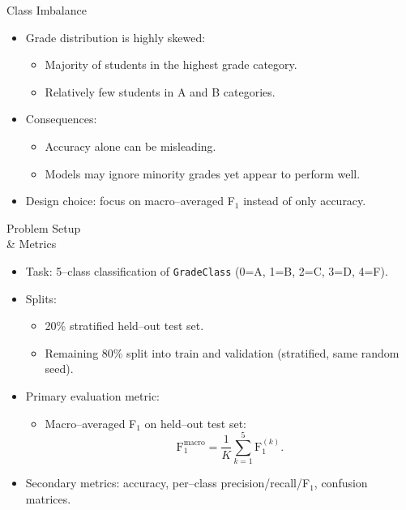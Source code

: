 \documentclass[aspectratio=169]{beamer}
\begin{document}
\begin{frame}{Class Imbalance}
  \begin{itemize}
    \item Grade distribution is highly skewed:
    \begin{itemize}
      \item Majority of students in the highest grade category.
      \item Relatively few students in A and B categories.
    \end{itemize}
    \item Consequences:
    \begin{itemize}
      \item Accuracy alone can be misleading.
      \item Models may ignore minority grades yet appear to perform well.
    \end{itemize}
    \item Design choice: focus on macro--averaged F$_1$ instead of only accuracy.
  \end{itemize}
\end{frame}

\begin{frame}{Problem Setup \\ \& Metrics}
  \begin{itemize}
    \item Task: 5--class classification of \texttt{GradeClass} (0=A, 1=B, 2=C, 3=D, 4=F).
    \item Splits:
    \begin{itemize}
      \item 20\% stratified held--out test set.
      \item Remaining 80\% split into train and validation (stratified, same random seed).
    \end{itemize}
    \item Primary evaluation metric:
    \begin{itemize}
      \item Macro--averaged F$_1$ on held--out test set:
      \[ \text{F}_1^{\text{macro}} = \frac{1}{K} \sum_{k=1}^{5} \text{F}_1^{(k)}. \]
    \end{itemize}
    \item Secondary metrics: accuracy, per--class precision/recall/F$_1$, confusion matrices.
  \end{itemize}
\end{frame}
\end{document}

